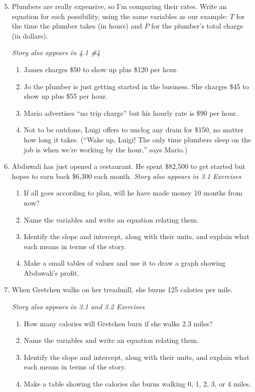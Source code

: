 \begin{enumerate} 
\setcounter{enumi}{4}

\item Plumbers are really expensive, so I'm comparing their rates.  Write an equation for each possibility, using the same variables as our example:  $T$ for the time the plumber takes (in hours) and $P$ for the plumber's total charge (in dollars). 

 \hfill \emph{Story also appears in 4.1 \#4}
\begin{enumerate}
\item James charges \$50 to show up plus \$120 per hour. 
\item Jo the plumber is just getting started in the business.  She charges \$45 to show up plus \$55 per hour.
\item Mario advertises ``no trip charge'' but his hourly rate is \$90 per hour. 
\item Not to be outdone, Luigi offers to unclog any drain for \$150, no matter how long it takes.  (``Wake up, Luigi! The only time plumbers sleep on the job is when we're working by the hour,'' says Mario.)
\end{enumerate} 

\item Abduwali has just opened a restaurant. He spent \$82,500 to get started but hopes to earn back \$6,300 each month.  \hfill \emph{Story also appears in 3.1 Exercises}
\begin{enumerate}
\item If all goes according to plan, will he have made money 10 months from now?
\item Name the variables and write an equation relating them.
\item Identify the slope and intercept, along with their units, and explain what each means in terms of the story. 
\item Make a small tables of values and use it to draw a graph showing Abduwali's profit.
\end{enumerate}

\item When Gretchen walks on her treadmill, she burns 125 calories per mile.

\hfill \emph{Story also appears in 3.1 and 3.2 Exercises}
\begin{enumerate}
\item How many calories will Gretchen burn if she walks 2.3 miles?
\item Name the variables and write an equation relating them.
\item Identify the slope and intercept, along with their units, and explain what each means in terms of the story. 
\item Make a table showing the calories she burns walking 0, 1, 2, 3, or 4 miles.
\end{enumerate} 


\end{enumerate}
